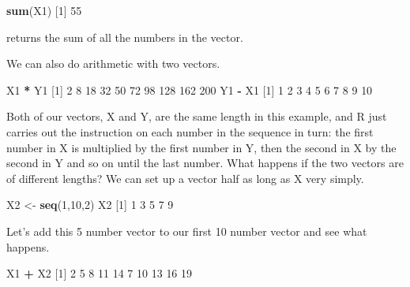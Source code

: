 \documentclass[
]{book}
\newenvironment{Shaded}{\begin{snugshade}}{\end{snugshade}}
\newcommand{\DecValTok}[1]{\textcolor[rgb]{0.00,0.00,0.81}{#1}}
\newcommand{\KeywordTok}[1]{\textcolor[rgb]{0.13,0.29,0.53}{\textbf{#1}}}
\newcommand{\NormalTok}[1]{#1}
\newcommand{\OperatorTok}[1]{\textcolor[rgb]{0.81,0.36,0.00}{\textbf{#1}}}
\newcommand{\StringTok}[1]{\textcolor[rgb]{0.31,0.60,0.02}{#1}}
\begin{document}
\begin{Shaded}
\begin{Highlighting}[]
\KeywordTok{sum}\NormalTok{(X1)}
\NormalTok{[}\DecValTok{1}\NormalTok{] }\DecValTok{55}
\end{Highlighting}
\end{Shaded}

returns the sum of all the numbers in the vector.

We can also do arithmetic with two vectors.

\begin{Shaded}
\begin{Highlighting}[]
\NormalTok{X1 }\OperatorTok{*}\StringTok{ }\NormalTok{Y1}
\NormalTok{ [}\DecValTok{1}\NormalTok{]   }\DecValTok{2}   \DecValTok{8}  \DecValTok{18}  \DecValTok{32}  \DecValTok{50}  \DecValTok{72}  \DecValTok{98} \DecValTok{128} \DecValTok{162} \DecValTok{200}
\NormalTok{Y1 }\OperatorTok{-}\StringTok{ }\NormalTok{X1}
\NormalTok{ [}\DecValTok{1}\NormalTok{]  }\DecValTok{1}  \DecValTok{2}  \DecValTok{3}  \DecValTok{4}  \DecValTok{5}  \DecValTok{6}  \DecValTok{7}  \DecValTok{8}  \DecValTok{9} \DecValTok{10}
\end{Highlighting}
\end{Shaded}

Both of our vectors, X and Y, are the same length in this example, and R just carries out the instruction on each number in the sequence in turn: the first number in X is multiplied by the first number in Y, then the second in X by the second in Y and so on until the last number. What happens if the two vectors are of different lengths? We can set up a vector half as long as X very simply.

\begin{Shaded}
\begin{Highlighting}[]
\NormalTok{X2 <-}\StringTok{ }\KeywordTok{seq}\NormalTok{(}\DecValTok{1}\NormalTok{,}\DecValTok{10}\NormalTok{,}\DecValTok{2}\NormalTok{)}
\NormalTok{X2}
\NormalTok{[}\DecValTok{1}\NormalTok{] }\DecValTok{1} \DecValTok{3} \DecValTok{5} \DecValTok{7} \DecValTok{9}
\end{Highlighting}
\end{Shaded}

Let's add this 5 number vector to our first 10 number vector and see what happens.

\begin{Shaded}
\begin{Highlighting}[]
\NormalTok{X1 }\OperatorTok{+}\StringTok{ }\NormalTok{X2}
\NormalTok{ [}\DecValTok{1}\NormalTok{]  }\DecValTok{2}  \DecValTok{5}  \DecValTok{8} \DecValTok{11} \DecValTok{14}  \DecValTok{7} \DecValTok{10} \DecValTok{13} \DecValTok{16} \DecValTok{19}
\end{Highlighting}
\end{Shaded}
\end{document}
